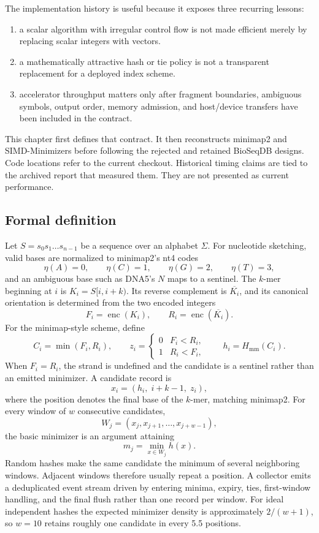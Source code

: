 The implementation history is useful because it exposes three recurring
lessons:

\begin{enumerate}
  \item a scalar algorithm with irregular control flow is not made efficient
        merely by replacing scalar integers with vectors.
  \item a mathematically attractive hash or tie policy is not a transparent
        replacement for a deployed index scheme.
  \item accelerator throughput matters only after fragment boundaries,
        ambiguous symbols, output order, memory admission, and host/device
        transfers have been included in the contract.
\end{enumerate}

This chapter first defines that contract.  It then reconstructs
minimap2 and SIMD-Minimizers before following the rejected and retained
BioSeqDB designs.  Code locations refer to the current checkout.  Historical
timing claims are tied to the archived report that measured them. They are not
presented as current performance.

\subsection{Formal definition}
\label{sec:minimizer-definition}

Let $S=s_0s_1\ldots s_{n-1}$ be a sequence over an alphabet $\Sigma$.  For
nucleotide sketching, valid bases are normalized to minimap2's nt4 codes
\[
  \eta(A)=0,\qquad \eta(C)=1,\qquad \eta(G)=2,\qquad \eta(T)=3,
\]
and an ambiguous base such as DNA5's $N$ maps to a sentinel.  The $k$-mer
beginning at $i$ is $K_i=S[i,i+k)$.  Its reverse complement is
$\overline{K_i}$, and its canonical orientation is determined from the two
encoded integers
\[
  F_i=\operatorname{enc}(K_i),\qquad
  R_i=\operatorname{enc}(\overline{K_i}).
\]
For the minimap-style scheme, define
\[
  C_i=\min(F_i,R_i),\qquad
  z_i=\begin{cases}0&F_i<R_i,\\1&R_i<F_i,\end{cases}
  \qquad h_i=H_{\mathrm{mm}}(C_i).
\]
When $F_i=R_i$, the strand is undefined and the candidate is a sentinel rather
than an emitted minimizer.  A candidate record is
\[
  x_i=(h_i,\;i+k-1,\;z_i),
\]
where the position denotes the final base of the $k$-mer, matching minimap2.
For every window of $w$ consecutive candidates,
\[
  W_j=(x_j,x_{j+1},\ldots,x_{j+w-1}),
\]
the basic minimizer is an argument attaining
\[
  m_j=\min_{x\in W_j} h(x).
\]
Random hashes make the same candidate the minimum of several neighboring
windows. Adjacent windows therefore usually repeat a position. A collector
emits a deduplicated event stream driven by entering minima, expiry, ties,
first-window handling, and the final flush rather than one record per window. For
ideal independent hashes the expected minimizer density is approximately
$2/(w+1)$, so $w=10$ retains roughly one candidate in every 5.5 positions.

